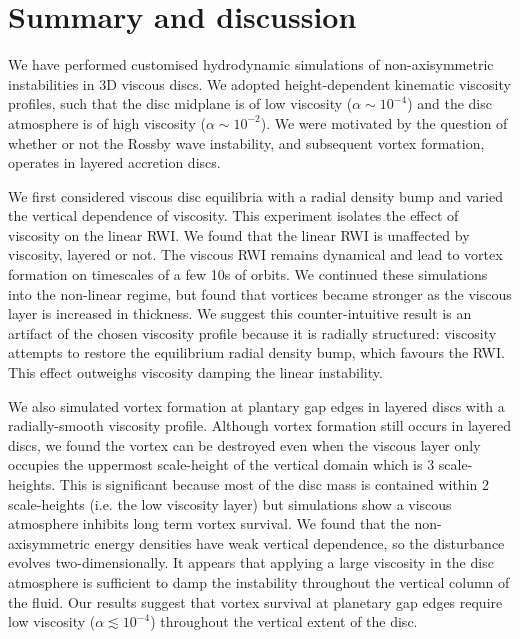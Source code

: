 \section{Summary and discussion}\label{summary}
We have performed customised hydrodynamic simulations of
non-axisymmetric instabilities in 3D viscous discs. We adopted
height-dependent kinematic viscosity profiles, such that the disc
midplane is of low viscosity ($\alpha\sim 10^{-4}$) and the disc
atmosphere is of high viscosity ($\alpha\sim 10^{-2}$). We were motivated  
by the question of whether or not the Rossby wave instability, and
subsequent vortex formation, operates in layered accretion discs.  

We first considered viscous disc equilibria with a radial density
bump and varied the vertical dependence of viscosity. 
This experiment isolates the effect of viscosity on the
linear RWI. We found that the linear RWI is unaffected by viscosity,
layered or not. The viscous RWI remains dynamical and lead to vortex
formation on timescales of a few 10s of orbits. We continued these
simulations into the non-linear regime, but found that vortices became
stronger as the viscous layer is increased in thickness. We suggest this
counter-intuitive result is an artifact of the chosen viscosity
profile because it is radially structured: viscosity attempts to
restore the equilibrium radial density bump, which favours the
RWI. This effect outweighs viscosity damping the linear instability. 

We also simulated vortex formation at plantary gap edges in layered
discs with a radially-smooth viscosity profile. %
Although vortex formation still 
occurs in layered discs, we found the vortex can be destroyed even when the viscous
layer only occupies the uppermost scale-height of the vertical domain
which is 3 scale-heights. This is significant because most of the disc
mass is contained within 2 scale-heights (i.e. the low viscosity
layer) but simulations show a viscous atmosphere inhibits long term
vortex survival.    
We found that the non-axisymmetric energy densities have
weak vertical dependence, so the disturbance evolves
two-dimensionally. It appears that applying a large viscosity in the
disc atmosphere is sufficient to damp the instability throughout the
vertical column of the fluid. Our results suggest that vortex
survival at planetary gap edges require low viscosity
($\alpha\lesssim10^{-4}$) throughout the vertical extent of the
disc. 


